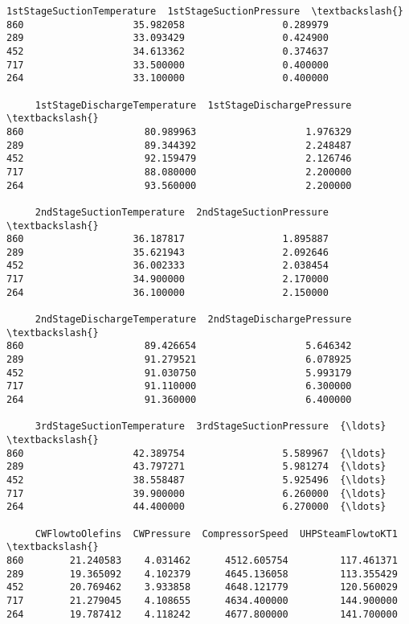 \documentclass[11pt]{article}
\makeatletter
\newcommand{\boxspacing}{\kern\kvtcb@left@rule\kern\kvtcb@boxsep}
\newcommand{\prompt}[4]{
        \ttfamily\llap{{\color{#2}[#3]:\hspace{3pt}#4}}\vspace{-\baselineskip}
    }
\makeatother
\begin{document}
            \begin{tcolorbox}[breakable, size=fbox, boxrule=.5pt, pad at break*=1mm, opacityfill=0]
\prompt{Out}{outcolor}{35}{\boxspacing}
\begin{Verbatim}[commandchars=\\\{\}]
     1stStageSuctionTemperature  1stStageSuctionPressure  \textbackslash{}
860                   35.982058                 0.289979
289                   33.093429                 0.424900
452                   34.613362                 0.374637
717                   33.500000                 0.400000
264                   33.100000                 0.400000

     1stStageDischargeTemperature  1stStageDischargePressure  \textbackslash{}
860                     80.989963                   1.976329
289                     89.344392                   2.248487
452                     92.159479                   2.126746
717                     88.080000                   2.200000
264                     93.560000                   2.200000

     2ndStageSuctionTemperature  2ndStageSuctionPressure  \textbackslash{}
860                   36.187817                 1.895887
289                   35.621943                 2.092646
452                   36.002333                 2.038454
717                   34.900000                 2.170000
264                   36.100000                 2.150000

     2ndStageDischargeTemperature  2ndStageDischargePressure  \textbackslash{}
860                     89.426654                   5.646342
289                     91.279521                   6.078925
452                     91.030750                   5.993179
717                     91.110000                   6.300000
264                     91.360000                   6.400000

     3rdStageSuctionTemperature  3rdStageSuctionPressure  {\ldots}  \textbackslash{}
860                   42.389754                 5.589967  {\ldots}
289                   43.797271                 5.981274  {\ldots}
452                   38.558487                 5.925496  {\ldots}
717                   39.900000                 6.260000  {\ldots}
264                   44.400000                 6.270000  {\ldots}

     CWFlowtoOlefins  CWPressure  CompressorSpeed  UHPSteamFlowtoKT1  \textbackslash{}
860        21.240583    4.031462      4512.605754         117.461371
289        19.365092    4.102379      4645.136058         113.355429
452        20.769462    3.933858      4648.121779         120.560029
717        21.279045    4.108655      4634.400000         144.900000
264        19.787412    4.118242      4677.800000         141.700000


\end{Verbatim}
\end{tcolorbox}
\end{document}
